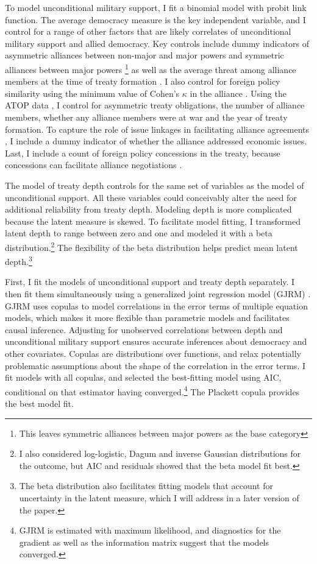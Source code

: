 \documentclass[12pt]{article}
\begin{document}
To model unconditional military support, I fit a binomial model with probit link function. 
The average democracy measure is the key independent variable, and I control for a range of other factors that are likely correlates of unconditional military support and allied democracy. 
Key controls include dummy indicators of asymmetric alliances between non-major and major powers and symmetric alliances between major powers \citep{Mattes2012}\footnote{This leaves symmetric alliances between major powers as the base category} as well as the average threat among alliance members at the time of treaty formation \citep{LeedsSavun2007}. 
I also control for foreign policy similarity \citep{Benson2012} using the minimum value of Cohen's $\kappa$ in the alliance \citep{Hage2011}.
Using the ATOP data \citep{Leedsetal2002}, I control for asymmetric treaty obligations, the number of alliance members, whether any alliance members were at war and the year of treaty formation. 
To capture the role of issue linkages in facilitating alliance agreements \citep{Poast2012, Poast2013}, I include a dummy indicator of whether the alliance addressed economic issues.  
Last, I include a count of foreign policy concessions in the treaty, because concessions can facilitate alliance negotiations \citep{Johnson2015}. 


The model of treaty depth controls for the same set of variables as the model of unconditional support. 
All these variables could conceivably alter the need for additional reliability from treaty depth. 
Modeling depth is more complicated because the latent measure is skewed.
To facilitate model fitting, I transformed latent depth to range between zero and one and modeled it with a beta distribution.\footnote{I also considered log-logistic, Dagum and inverse Gaussian distributions for the outcome, but AIC and residuals showed that the beta model fit best.}
The flexibility of the beta distribution helps predict mean latent depth.\footnote{The beta distribution also facilitates fitting models that account for uncertainty in the latent measure, which I will address in a later version of the paper.} 


First, I fit the models of unconditional support and treaty depth separately. 
I then fit them simultaneously using a generalized joint regression model (GJRM) \citep{Braumoelleretal2018}.
GJRM uses copulas to model correlations in the error terms of multiple equation models, which makes it more flexible than parametric models and facilitates causal inference. 
Adjusting for unobserved correlations between depth and unconditional military support ensures accurate inferences about democracy and other covariates. 
Copulas are distributions over functions, and relax potentially problematic assumptions about the shape of the correlation in the error terms. 
I fit models with all copulas, and selected the best-fitting model using AIC, conditional on that estimator having converged.\footnote{GJRM is estimated with maximum likelihood, and diagnostics for the gradient as well as the information matrix suggest that the models converged.} 
The Plackett copula provides the best model fit.
\end{document}
